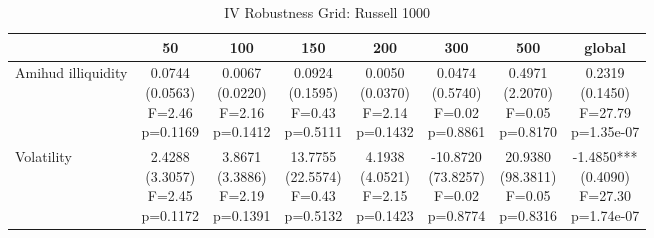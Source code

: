\begin{table}[!htbp]\centering
\caption{IV Robustness Grid: Russell 1000}
\label{tab:iv_robustness_grid_r1000}
\begin{threeparttable}
\footnotesize
\setlength{\tabcolsep}{2.8pt}
\renewcommand{\arraystretch}{1.05}
\begin{tabular}{lccccccc}
\toprule
 & 50 & 100 & 150 & 200 & 300 & 500 & global \\
\midrule
Amihud illiquidity & \shortstack{0.0744\\(0.0563)\\F=2.46\\p=0.1169} & \shortstack{0.0067\\(0.0220)\\F=2.16\\p=0.1412} & \shortstack{0.0924\\(0.1595)\\F=0.43\\p=0.5111} & \shortstack{0.0050\\(0.0370)\\F=2.14\\p=0.1432} & \shortstack{0.0474\\(0.5740)\\F=0.02\\p=0.8861} & \shortstack{0.4971\\(2.2070)\\F=0.05\\p=0.8170} & \shortstack{0.2319\\(0.1450)\\F=27.79\\p=1.35e-07} \\
Volatility & \shortstack{2.4288\\(3.3057)\\F=2.45\\p=0.1172} & \shortstack{3.8671\\(3.3886)\\F=2.19\\p=0.1391} & \shortstack{13.7755\\(22.5574)\\F=0.43\\p=0.5132} & \shortstack{4.1938\\(4.0521)\\F=2.15\\p=0.1423} & \shortstack{-10.8720\\(73.8257)\\F=0.02\\p=0.8774} & \shortstack{20.9380\\(98.3811)\\F=0.05\\p=0.8316} & \shortstack{-1.4850***\\(0.4090)\\F=27.30\\p=1.74e-07} \\

\end{tabular}
\end{threeparttable}
\end{table}
